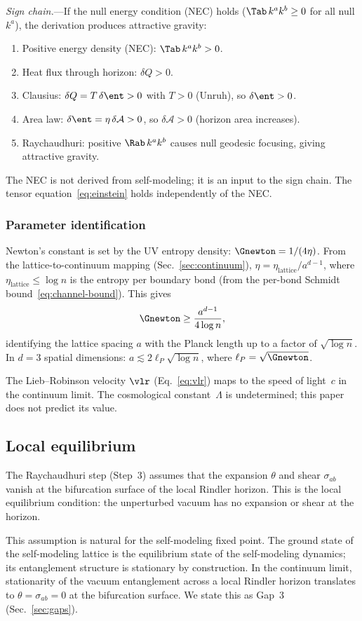 \emph{Sign chain.}---If the null energy condition (NEC) holds
($\Tab\, k^a k^b \geq 0$ for all null $k^a$), the derivation produces
attractive gravity:
\begin{enumerate}
\item Positive energy density (NEC): $\Tab\, k^a k^b > 0$.
\item Heat flux through horizon: $\delta Q > 0$.
\item Clausius: $\delta Q = T\,\delta\ent > 0$ with $T > 0$ (Unruh),
  so $\delta\ent > 0$.
\item Area law: $\delta\ent = \eta\,\delta\mathcal{A} > 0$, so
  $\delta\mathcal{A} > 0$ (horizon area increases).
\item Raychaudhuri: positive $\Rab\, k^a k^b$ causes null geodesic
  focusing, giving attractive gravity.
\end{enumerate}
The NEC is not derived from self-modeling; it is an input to the sign
chain.  The tensor equation~\eqref{eq:einstein} holds independently
of the NEC.

\subsubsection{Parameter identification}
\label{sec:parameters}

Newton's constant is set by the UV entropy density:
$\Gnewton = 1/(4\eta)$.  From the lattice-to-continuum mapping
(Sec.~\ref{sec:continuum}), $\eta = \eta_{\mathrm{lattice}}/a^{d-1}$,
where $\eta_{\mathrm{lattice}} \leq \log n$ is the entropy per
boundary bond (from the per-bond Schmidt
bound~\eqref{eq:channel-bound}).  This gives
\begin{equation}
  \Gnewton \geq \frac{a^{d-1}}{4\log n},
  \label{eq:g-bound}
\end{equation}
identifying the lattice spacing $a$ with the Planck length up to a
factor of $\sqrt{\log n}$.  In $d = 3$ spatial dimensions:
$a \lesssim 2\ell_P\sqrt{\log n}$, where
$\ell_P = \sqrt{\Gnewton}$.

The Lieb--Robinson velocity $\vlr$ (Eq.~\ref{eq:vlr}) maps to the
speed of light~$c$ in the continuum limit.  The cosmological
constant~$\Lambda$ is undetermined; this paper does not predict its
value.

\subsection{Local equilibrium}
\label{sec:local-eq}

The Raychaudhuri step (Step~3) assumes that the expansion $\theta$ and
shear $\sigma_{ab}$ vanish at the bifurcation surface of the local
Rindler horizon.  This is the local equilibrium condition: the
unperturbed vacuum has no expansion or shear at the horizon.

This assumption is natural for the self-modeling fixed point.  The
ground state of the self-modeling lattice is the equilibrium state of
the self-modeling dynamics; its entanglement structure is stationary by
construction.  In the continuum limit, stationarity of the vacuum
entanglement across a local Rindler horizon translates to
$\theta = \sigma_{ab} = 0$ at the bifurcation surface.  We state this
as Gap~3 (Sec.~\ref{sec:gaps}).

